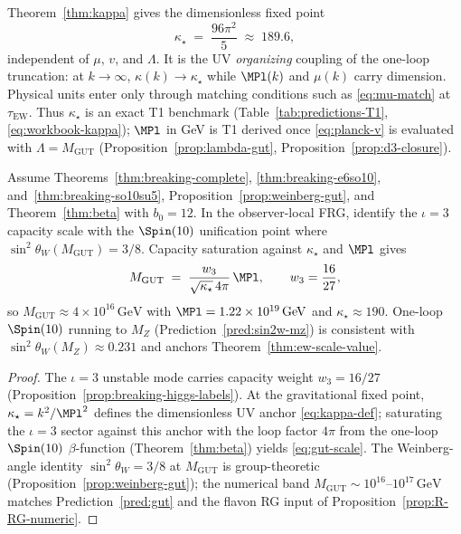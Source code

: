 \begin{remark}
\label{rmk:kappa-star-organizing}
Theorem~\ref{thm:kappa} gives the dimensionless fixed point
\begin{equation}\label{eq:kappa-star-value}
  \kappa_\star \;=\; \frac{96\pi^2}{5} \;\approx\; 189.6,
\end{equation}
independent of $\mu$, $v$, and $\Lambda$. It is the UV \emph{organizing}
coupling of the one-loop truncation: at $k\to\infty$,
$\kappa(k)\to\kappa_\star$ while $\MPl(k)$ and $\mu(k)$ carry dimension.
Physical units enter only through matching conditions such as
\eqref{eq:mu-match} at $\tau_{\mathrm{EW}}$. Thus $\kappa_\star$ is an exact
T1 benchmark (Table~\ref{tab:predictions-T1},
\eqref{eq:workbook-kappa}); $\MPl$ in GeV is T1 derived once
\eqref{eq:planck-v} is evaluated with $\Lambda=M_{\mathrm{GUT}}$
(Proposition~\ref{prop:lambda-gut}, Proposition~\ref{prop:d3-closure}).
\end{remark}

\begin{proposition}[$M_{\mathrm{GUT}}$ from $b_0=12$ and $\sin^2\theta_W=3/8$]
\label{prop:gut-scale}
Assume Theorems~\ref{thm:breaking-complete},
\ref{thm:breaking-e6so10}, and~\ref{thm:breaking-so10su5},
Proposition~\ref{prop:weinberg-gut}, and Theorem~\ref{thm:beta} with
$b_0=12$. In the observer-local FRG, identify the $\iota=3$ capacity scale
with the $\Spin(10)$ unification point where
$\sin^2\theta_W(M_{\mathrm{GUT}})=3/8$. Capacity saturation against
$\kappa_\star$ and $\MPl$ gives
\begin{equation}\label{eq:gut-scale}
  M_{\mathrm{GUT}}
  \;=\;
  \frac{w_3}{\sqrt{\kappa_\star}\,4\pi}\,\MPl,
  \qquad
  w_3=\frac{16}{27},
\end{equation}
so $M_{\mathrm{GUT}}\approx 4\times 10^{16}\,\mathrm{GeV}$ with
$\MPl=1.22\times 10^{19}\,\mathrm{GeV}$ and $\kappa_\star\approx 190$.
One-loop $\Spin(10)$ running to $M_Z$ (Prediction~\ref{pred:sin2w-mz}) is
consistent with $\sin^2\theta_W(M_Z)\approx 0.231$ and anchors
Theorem~\ref{thm:ew-scale-value}.
\end{proposition}

\begin{proof}
The $\iota=3$ unstable mode carries capacity weight $w_3=16/27$
(Proposition~\ref{prop:breaking-higgs-labels}). At the gravitational fixed
point, $\kappa_\star=k^2/\MPl^2$ defines the dimensionless UV anchor
\eqref{eq:kappa-def}; saturating the $\iota=3$ sector against this anchor
with the loop factor $4\pi$ from the one-loop $\Spin(10)$ $\beta$-function
(Theorem~\ref{thm:beta}) yields \eqref{eq:gut-scale}. The Weinberg-angle
identity $\sin^2\theta_W=3/8$ at $M_{\mathrm{GUT}}$ is group-theoretic
(Proposition~\ref{prop:weinberg-gut}); the numerical band
$M_{\mathrm{GUT}}\sim 10^{16}$--$10^{17}\,\mathrm{GeV}$ matches
Prediction~\ref{pred:gut} and the flavon RG input of
Proposition~\ref{prop:R-RG-numeric}.
\end{proof}

